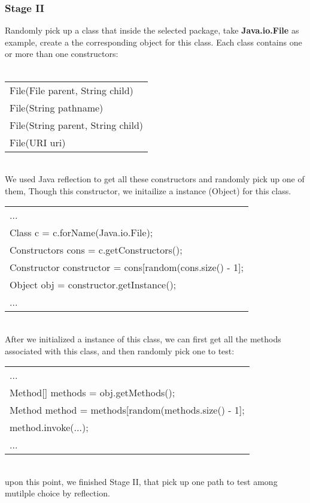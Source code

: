\documentclass{article}
\begin{document}
\subsubsection{Stage II} 
Randomly pick up a class that inside the 
selected package, take {\bf \small \ttfamily Java.io.File} as example,  
create a the corresponding object for this class. Each class contains one or 
more than one constructors: \\ \\
{\bf \small \ttfamily
\begin{tabular} {l}
File(File parent, String child) \\
File(String pathname) \\
File(String parent, String child) \\
File(URI uri)\\
\end{tabular} } \\

 We used Java reflection to get all these constructors and randomly 
pick up one of them, Though this constructor, we initailize a 
instance (Object) for this class. \\
{\bf \small \ttfamily
\begin{tabular}{l}
... \\
Class c = c.forName(Java.io.File); \\
Constructors cons = c.getConstructors();\\
Constructor constructor = cons[random(cons.size() - 1];\\
Object obj = constructor.getInstance();\\
...
\end{tabular} } \\

After we initialized a instance of this class, we can first get all the methods
 associated with this class, and then randomly pick one to test:\\
{\bf \small \ttfamily 
\begin{tabular}{l}
...\\
Method[] methods = obj.getMethods();\\
Method method = methods[random(methods.size() - 1];\\
method.invoke(...);\\
...\\
\end{tabular} } \\
upon this point, we finished Stage II, that pick up one path to test among 
mutilple choice by reflection.\\
\end{document}
